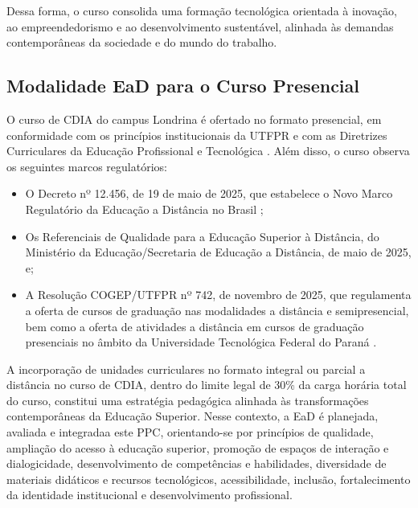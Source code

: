 Dessa forma, o curso consolida uma formação tecnológica orientada à inovação, ao empreendedorismo e ao desenvolvimento sustentável, alinhada às demandas contemporâneas da sociedade e do mundo do trabalho.


\subsection{Modalidade EaD para o Curso Presencial}

O curso de CDIA do campus Londrina é ofertado no formato presencial, em conformidade com os princípios institucionais da UTFPR e com as Diretrizes Curriculares da Educação Profissional e Tecnológica \cite{Analise_DNC_2021}. Além disso, o curso observa os seguintes marcos regulatórios:

\begin{itemize}
    \item O Decreto nº 12.456, de 19 de maio de 2025, que estabelece o Novo Marco Regulatório da Educação a Distância no Brasil \cite{Brasil_EaD_2025};
    \item Os Referenciais de Qualidade para a Educação Superior à Distância, do Ministério da Educação/Secretaria de Educação a Distância, de maio de 2025, e;
    \item A Resolução COGEP/UTFPR nº 742, de novembro de 2025, que regulamenta a oferta de cursos de graduação nas modalidades a distância e semipresencial, bem como a oferta de atividades a distância em cursos de graduação presenciais no âmbito da Universidade Tecnológica Federal do Paraná \cite{UTFPR_EAD_2022}.
\end{itemize}

A incorporação de unidades curriculares no formato integral ou parcial a distância no curso de CDIA, dentro do limite legal de 30\% da carga horária total do curso, constitui uma estratégia pedagógica alinhada às transformações contemporâneas da Educação Superior. Nesse contexto, a EaD é planejada, avaliada e integradaa este PPC, orientando-se por princípios de qualidade, ampliação do acesso à educação superior, promoção de espaços de interação e dialogicidade, desenvolvimento de competências e habilidades, diversidade de materiais didáticos e recursos tecnológicos, acessibilidade, inclusão, fortalecimento da identidade institucional e desenvolvimento profissional.

